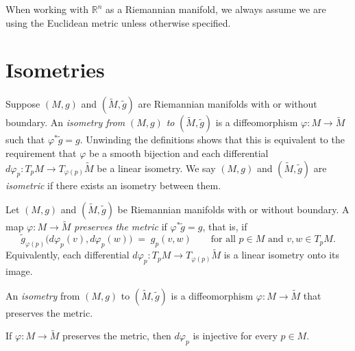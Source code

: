 When working with $\mathbb{R}^n$ as a Riemannian manifold, we always assume we are using the Euclidean metric unless otherwise specified.

\section{Isometries}

Suppose $(M, g)$ and $(\widetilde{M}, \widetilde{g})$ are Riemannian manifolds with or without boundary. An \emph{isometry from} $(M,g)$ \emph{to} $(\widetilde{M},\widetilde{g})$ is a diffeomorphism $\varphi: M \to \widetilde{M}$ such that $\varphi^* \widetilde{g} = g$. Unwinding the definitions shows that this is equivalent to the requirement that $\varphi$ be a smooth bijection and each differential $d\varphi_p: T_p M \to T_{\varphi(p)} \widetilde{M}$ be a linear isometry. We say $(M, g)$ and $(\widetilde{M}, \widetilde{g})$ are \emph{isometric} if there exists an isometry between them.

\begin{definition}
\label{def:metric-preserving}
\leanok
{}
Let $(M,g)$ and $(\widetilde{M}, \widetilde{g})$ be Riemannian manifolds with or without boundary. A map $\varphi: M \to \widetilde{M}$ \emph{preserves the metric} if $\varphi^* \widetilde{g} = g$, that is, if
\[
  \widetilde{g}_{\varphi(p)}\bigl(d\varphi_p(v), d\varphi_p(w)\bigr) \;=\; g_p(v,w)
  \qquad \text{for all } p \in M \text{ and } v, w \in T_p M.
\]
Equivalently, each differential $d\varphi_p : T_p M \to T_{\varphi(p)} \widetilde{M}$ is a linear isometry onto its image.
\end{definition}

\begin{definition}[Isometry]
\label{def:isometry}
\leanok
{}
An \emph{isometry} from $(M,g)$ to $(\widetilde{M},\widetilde{g})$ is a diffeomorphism $\varphi: M \to \widetilde{M}$ that preserves the metric.
\end{definition}

\begin{lemma}
\label{lem:metric-preserving-immersion}
\leanok
{}
If $\varphi: M \to \widetilde{M}$ preserves the metric, then $d\varphi_p$ is injective for every $p \in M$.
\end{lemma}

